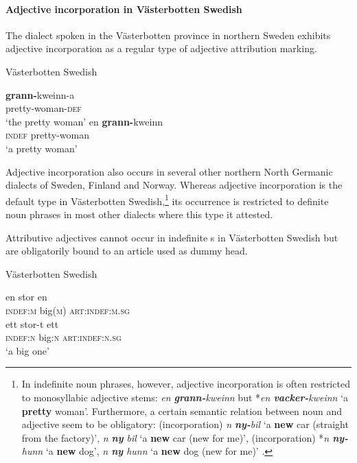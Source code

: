 \paragraph*{Adjective incorporation in Västerbotten Swedish} \label{bondska synchr}
The dialect spoken in the Västerbotten province in northern Sweden exhibits adjective incorporation as a regular type of adjective attribution marking.
\begin{exe}
\ex \rm{Västerbotten Swedish \citep[91–92]{holmberg-etal2003}}
\begin{xlist}
\ex
\gll 	\textbf{grann-}kweinn-a\\	
	pretty-woman-\textsc{def}\\
\glt	‘the pretty woman’
\ex
\gll	en \textbf{grann-}kweinn\\
	\textsc{indef} pretty-woman\\
\glt	‘a pretty woman’
\end{xlist}
\end{exe}
Adjective incorporation also occurs in several other northern North Germanic dialects of Sweden, Finland and Norway. Whereas adjective incorporation is the default type in Västerbotten Swedish,\footnote{In indefinite noun phrases, however, adjective incorporation is often restricted to monosyllabic adjective stems: \textit{en \textbf{grann-}kweinn} but *\textit{en \textbf{vacker-}kweinn} ‘a \textbf{pretty} woman’. Furthermore, a certain semantic relation between noun and adjective seem to be obligatory: (incorporation) \textit{n \textbf{ny-}bil} ‘a \textbf{new} car (straight from the factory)’, \textit{n \textbf{ny} bil} ‘a \textbf{new} car (new for me)’, (incorporation) *\textit{n \textbf{ny-}hunn} ‘a \textbf{new} dog’, \textit{n \textbf{ny} hunn} ‘a \textbf{new} dog (new for me)’ \citep[91–92]{holmberg-etal2003}.} its occurrence is restricted to definite noun phrases in most other dialects where this type it attested.

Attributive adjectives cannot occur in indefinite s in Västerbotten Swedish but are obligatorily bound to an article used as dummy head.
\begin{exe}
\ex \rm{Västerbotten Swedish \citep{holmberg-etal2003,delsing1996b}}
\begin{xlist}
\ex
\gll 	en stor en\\	
	\textsc{indef:m} big(\textsc{m}) \textsc{art:indef:m.sg}\\
\ex
\gll 	ett stor-t ett\\	
	\textsc{indef:n} big:\textsc{n} \textsc{art:indef:n.sg}\\
\glt	‘a big one’
\end{xlist}
\end{exe}

